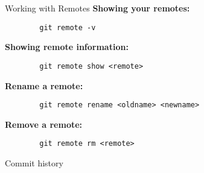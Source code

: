 \begin{frame}[fragile]{Working with Remotes}
    \textbf{Showing your remotes:}
    \begin{lstlisting}
        git remote -v
    \end{lstlisting}
    \textbf{Showing remote information:}
    \begin{lstlisting}
        git remote show <remote>
    \end{lstlisting}
    \textbf{Rename a remote:}
    \begin{lstlisting}
        git remote rename <oldname> <newname>
    \end{lstlisting}
    \textbf{Remove a remote:}
    \begin{lstlisting}
        git remote rm <remote>
    \end{lstlisting}

\end{frame}


\begin{frame}[fragile]{Commit history}
    \begin{minipage}{0.49\textwidth}
        \begin{figure}
        \end{figure}
    \end{minipage}
    \begin{minipage}{0.49\textwidth}
        \begin{itemize}
        \end{itemize}
    \end{minipage}
\end{frame}

